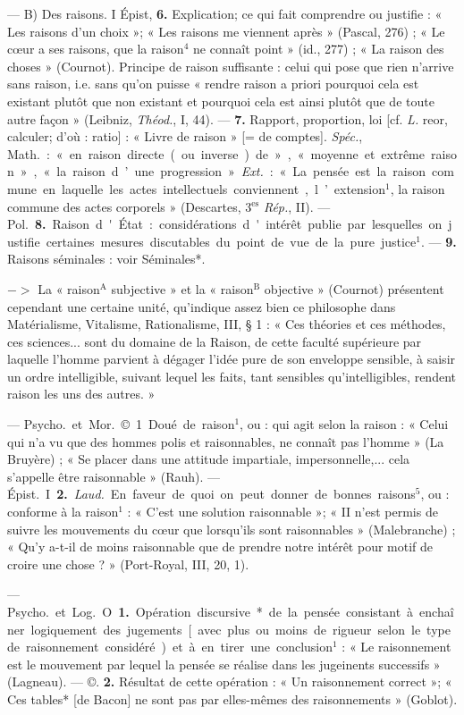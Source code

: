 \begin{itemize}[leftmargin=1cm, label=, itemsep=1pt]
— B) Des raisons. I Épist,
 {\bf 6.} Explication; ce qui fait comprendre ou justifie : « Les raisons
d’un choix »; « Les raisons me viennent
après » (Pascal, 276) ; « Le
cœur a ses raisons, que la raison$^4$ ne
connaît point » (id., 277) ; « La raison
des choses » (Cournot). Principe de
raison suffisante : celui qui pose que
rien n'arrive sans raison, i.e. sans
qu'on puisse « rendre raison a
priori pourquoi cela est existant
plutôt que non existant et pourquoi
cela est ainsi plutôt que de toute
autre façon » (Leibniz, {\it Théod.}, I, 44).
— {\bf 7.} Rapport, proportion, loi [cf.
{\it L.} reor, calculer; d’où : ratio] :
« Livre de raison » [= de comptes].
{\it Spéc.}, \si{Math.} : « en raison directe (ou
inverse) de... », « moyenne et extrême
raison », « la raison d’une progression ». {\it Ext.} : « La pensée est la
raison commune en laquelle les
actes intellectuels conviennent,...
l’extension$^1$, la raison commune des
actes corporels » (Descartes, 3$^\text{es}$ {\it Rép.},
II). — \si{Pol.} {\bf 8.} Raison d'État : considérations d'intérêt publie par lesquelles on justifie certaines mesures discutables du point de vue
de la pure justice$^1$. — {\bf 9.} Raisons
séminales : voir Séminales*.

$->$ La « raison$^\text{A}$ subjective » et
la « raison$^\text{B}$ objective » (Cournot)
présentent cependant une certaine
unité, qu’indique assez bien ce philosophe dans Matérialisme, Vitalisme, Rationalisme, III, § 1 : « Ces
théories et ces méthodes, ces sciences... sont du domaine de la Raison,
de cette faculté supérieure par laquelle l’homme parvient à dégager
l'idée pure de son enveloppe sensible, à saisir un ordre intelligible,
suivant lequel les faits, tant sensibles qu'intelligibles, rendent raison
les uns des autres. »

 — \si{Psycho.} et \si{Mor.} ©.
1. Doué de raison$^1$, ou : qui agit
selon la raison : « Celui qui n’a vu
que des hommes polis et raisonnables,
ne connaît pas l’homme »
(La Bruyère) ; « Se placer dans
une attitude impartiale, impersonnelle,... cela s'appelle être raisonnable » (Rauh). — \si{Épist.} I. {\bf 2.} {\it Laud.}
En faveur de quoi on peut donner de
bonnes raisons$^5$, ou : conforme à la
raison$^1$ : « C’est une solution raisonnable »; « II n’est permis de suivre
les mouvements du cœur que lorsqu’ils sont raisonnables » (Malebranche) ; « Qu’y a-t-il de moins
raisonnable que de prendre notre
intérêt pour motif de croire une
chose ? » (Port-Royal, III, 20, 1).

 — \si{Psycho.} et \si{Log.}
O. {\bf 1.} Opération discursive* de la
pensée consistant à enchaîner logiquement des jugements [avec plus
ou moins de rigueur selon le type
de raisonnement considéré) et à en
tirer une conclusion$^1$ : « Le raisonnement est le mouvement par lequel
la pensée se réalise dans les jugeinents successifs » (Lagneau). —
©. {\bf 2.} Résultat de cette opération :
« Un raisonnement correct »; « Ces
tables* [de Bacon] ne sont pas par
elles-mêmes des raisonnements »
(Goblot).


\end{itemize}
